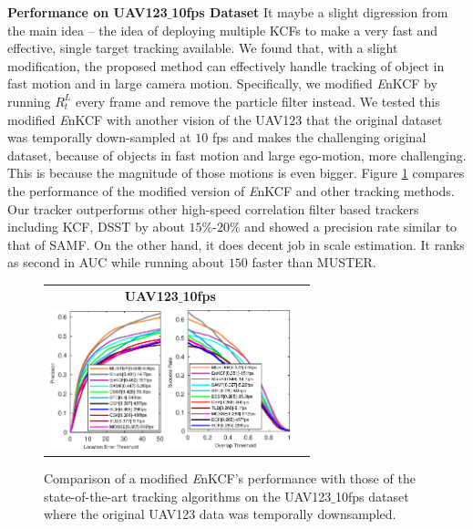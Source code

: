 \documentclass[10pt,twocolumn,letterpaper]{article}
\begin{document}
\textbf{Performance on UAV123$\_$10fps Dataset} It maybe a slight
digression from the main idea -- the idea of deploying multiple KCFs
to make a very fast and effective, single target tracking
available. We found that, with a slight modification, the proposed
method can effectively handle tracking of object in fast motion and in
large camera motion. Specifically, we modified {\it E}nKCF by running
$R_{t}^{L}$ every frame and remove the particle filter instead. We
tested this modified {\it E}nKCF with another vision of the UAV123 that
the original dataset was temporally down-sampled at $10$ fps and makes
the challenging original dataset, because of objects in fast motion
and large ego-motion, more challenging. This is because the magnitude
of those motions is even bigger. Figure \ref{fig:UAV123_10fpsDATASET}
compares the performance of the modified version of {\it E}nKCF and
other tracking methods. Our tracker outperforms other high-speed
correlation filter based trackers including KCF, DSST by about
$15\%$-$20\%$ and showed a precision rate similar to that of SAMF. On
the other hand, it does decent job in scale estimation. It ranks as
second in AUC while running about $150$ faster than MUSTER.

\begin{figure}[!h]
\centering
\begin{tabular}{cc}
\tiny\quad\textbf{UAV123$\_$10fps}\\
\includegraphics[width=3.30cm]{./figures/pr_uav123_10fps.eps}
\includegraphics[width=3.55cm]{./figures/sr_uav123_10fps.eps}\\
\end{tabular}
\caption{Comparison of a modified {\it E}nKCF's performance with those
  of the state-of-the-art tracking algorithms on the UAV123$\_$10fps
  dataset where the original UAV123 data was temporally downsampled.}
\label{fig:UAV123_10fpsDATASET}
\end{figure}
\end{document}

